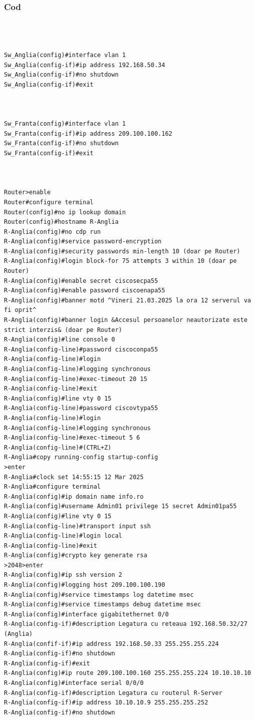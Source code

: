 \documentclass{article}
\begin{document}
\subsubsection{Cod}
\begin{verbatim}



Sw_Anglia(config)#interface vlan 1
Sw_Anglia(config-if)#ip address 192.168.50.34
Sw_Anglia(config-if)#no shutdown
Sw_Anglia(config-if)#exit



Sw_Franta(config)#interface vlan 1
Sw_Franta(config-if)#ip address 209.100.100.162
Sw_Franta(config-if)#no shutdown
Sw_Franta(config-if)#exit



Router>enable
Router#configure terminal
Router(config)#no ip lookup domain
Router(config)#hostname R-Anglia
R-Anglia(config)#no cdp run
R-Anglia(config)#service password-encryption
R-Anglia(config)#security passwords min-length 10 (doar pe Router)
R-Anglia(config)#login block-for 75 attempts 3 within 10 (doar pe Router)
R-Anglia(config)#enable secret ciscosecpa55
R-Anglia(config)#enable password ciscoenapa55
R-Anglia(config)#banner motd ^Vineri 21.03.2025 la ora 12 serverul va fi oprit^
R-Anglia(config)#banner login &Accesul persoanelor neautorizate este strict interzis& (doar pe Router)
R-Anglia(config)#line console 0
R-Anglia(config-line)#password ciscoconpa55
R-Anglia(config-line)#login
R-Anglia(config-line)#logging synchronous
R-Anglia(config-line)#exec-timeout 20 15
R-Anglia(config-line)#exit
R-Anglia(config)#line vty 0 15
R-Anglia(config-line)#password ciscovtypa55
R-Anglia(config-line)#login
R-Anglia(config-line)#logging synchronous
R-Anglia(config-line)#exec-timeout 5 6
R-Anglia(config-line)#(CTRL+Z)
R-Anglia#copy running-config startup-config
>enter
R-Anglia#clock set 14:55:15 12 Mar 2025
R-Anglia#configure terminal
R-Anglia(config)#ip domain name info.ro
R-Anglia(config)#username Admin01 privilege 15 secret Admin01pa55
R-Anglia(config)#line vty 0 15
R-Anglia(config-line)#transport input ssh
R-Anglia(config-line)#login local
R-Anglia(config-line)#exit
R-Anglia(config)#crypto key generate rsa
>2048>enter
R-Anglia(config)#ip ssh version 2
R-Anglia(config)#logging host 209.100.100.190
R-Anglia(config)#service timestamps log datetime msec
R-Anglia(config)#service timestamps debug datetime msec
R-Anglia(config)#interface gigabitethernet 0/0
R-Anglia(config-if)#description Legatura cu reteaua 192.168.50.32/27 (Anglia)
R-Anglia(confif-if)#ip address 192.168.50.33 255.255.255.224
R-Anglia(config-if)#no shutdown
R-Anglia(config-if)#exit
R-Anglia(config)#ip route 209.100.100.160 255.255.255.224 10.10.10.10
R-Anglia(config)#interface serial 0/0/0
R-Anglia(config-if)#description Legatura cu routerul R-Server
R-Anglia(config-if)#ip address 10.10.10.9 255.255.255.252
R-Anglia(config-if)#no shutdown


\end{verbatim}
\end{document}
